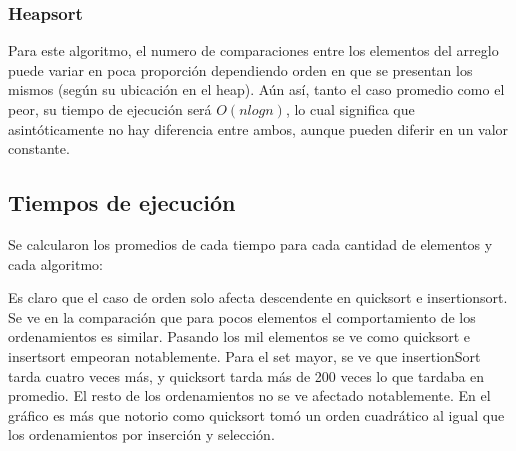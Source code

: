 \documentclass[article,a4paper]{article}
\begin{document}
\subsubsection{Heapsort}

Para este algoritmo, el numero de comparaciones entre los elementos del arreglo puede variar en poca proporción dependiendo orden en que se presentan los mismos (según su ubicación en el heap). Aún así, tanto el caso promedio como el peor, su tiempo de ejecución será $O(n log n)$, lo cual significa que asintóticamente no hay diferencia entre ambos, aunque pueden diferir en un valor constante.

\subsection{Tiempos de ejecución}

Se calcularon los promedios de cada tiempo para cada cantidad de elementos y cada algoritmo:

  
Es claro que el caso de orden solo afecta descendente en quicksort e insertionsort.
Se ve en la comparación que para pocos elementos el comportamiento de los ordenamientos es similar. Pasando los mil elementos se ve como quicksort e insertsort empeoran notablemente. Para el set mayor, se ve que insertionSort tarda cuatro veces más, y quicksort tarda más de 200 veces lo que tardaba en promedio. El resto de los ordenamientos no se ve afectado notablemente.
En el gráfico es más que notorio como quicksort tomó un orden cuadrático al igual que los ordenamientos por inserción y selección.
\end{document}
